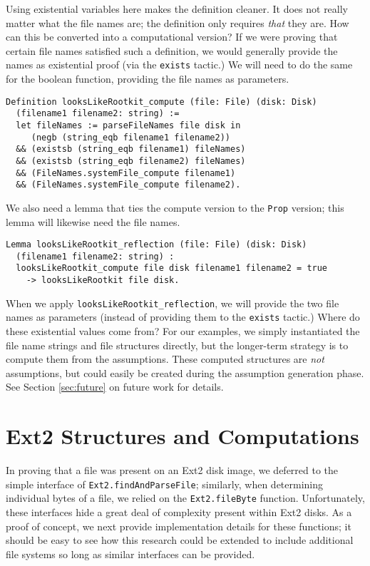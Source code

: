 \documentclass[nocopyrightspace,preprint]{sigplanconf}
\begin{document}
Using existential variables here makes the definition cleaner. It does not
really matter what the file names are; the definition only requires {\em that}
they are. How can this be converted into a computational version? If we were
proving that certain file names satisfied such a definition, we would
generally provide the names as existential proof (via the {\tt exists}
tactic.) We will need to do the same for the boolean function, providing the
file names as parameters.

\begin{lstlisting}
Definition looksLikeRootkit_compute (file: File) (disk: Disk)
  (filename1 filename2: string) :=
  let fileNames := parseFileNames file disk in
     (negb (string_eqb filename1 filename2))
  && (existsb (string_eqb filename1) fileNames)
  && (existsb (string_eqb filename2) fileNames)
  && (FileNames.systemFile_compute filename1)
  && (FileNames.systemFile_compute filename2).
\end{lstlisting}

We also need a lemma that ties the compute version to the {\tt Prop} version;
this lemma will likewise need the file names.

\begin{lstlisting}
Lemma looksLikeRootkit_reflection (file: File) (disk: Disk)
  (filename1 filename2: string) :
  looksLikeRootkit_compute file disk filename1 filename2 = true
    -> looksLikeRootkit file disk.
\end{lstlisting}

When we apply {\tt looksLikeRootkit\_reflection}, we will provide the two file
names as parameters (instead of providing them to the {\tt exists} tactic.)
Where do these existential values come from? For our examples, we simply
instantiated the file name strings and file structures directly, but the
longer-term strategy is to compute them from the assumptions. These computed
structures are {\em not} assumptions, but could easily be created during the
assumption generation phase. See Section \ref{sec:future} on future work for
details.

\section{Ext2 Structures and Computations}
\label{sec:ext2}

In proving that a file was present on an Ext2 disk image, we deferred to the
simple interface of {\tt Ext2.findAndParseFile}; similarly, when determining
individual bytes of a file, we relied on the {\tt Ext2.fileByte} function.
Unfortunately, these interfaces hide a great deal of complexity present within
Ext2 disks. As a proof of concept, we next provide implementation details for
these functions; it should be easy to see how this research could be extended
to include additional file systems so long as similar interfaces can be
provided.
\end{document}
